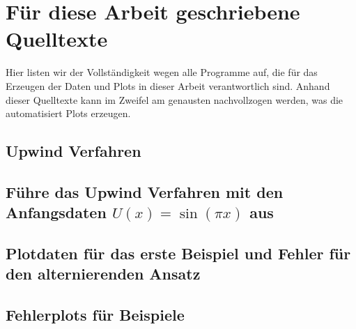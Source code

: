 \clearpage
\section{Für diese Arbeit geschriebene Quelltexte}
\label{appendix:transport:beispiel}

Hier listen wir der Vollständigkeit wegen alle Programme auf, die für das Erzeugen der Daten und Plots in dieser Arbeit verantwortlich sind.
Anhand dieser Quelltexte kann im Zweifel am genausten nachvollzogen werden, was die automatisiert Plots erzeugen.

\subsection*{Upwind Verfahren}


\subsection*{Führe das Upwind Verfahren mit den Anfangsdaten $U(x) = \sin(\pi x)$ aus}


\subsection*{Plotdaten für das erste Beispiel und Fehler für den alternierenden Ansatz}


\subsection*{Fehlerplots für Beispiele}



